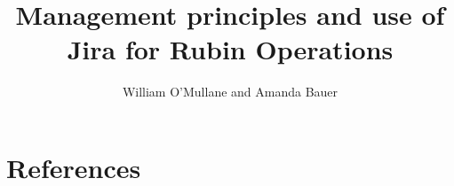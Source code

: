 \documentclass[DM,authoryear,toc]{lsstdoc}
\title{Management principles and use of Jira for Rubin Operations}
\author{%
William O'Mullane and  Amanda Bauer
}
\date{\vcsDate}
\begin{document}
\maketitle



\appendix
\section{References} \label{sec:bib}
\renewcommand{\refname}{} %


%
\printglossaries
\end{document}
